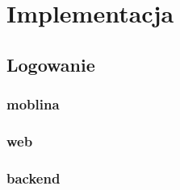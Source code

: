 \chapter{Implementacja}

\section{Logowanie}
\subsection{moblina}
\subsection{web}
\subsection{backend}